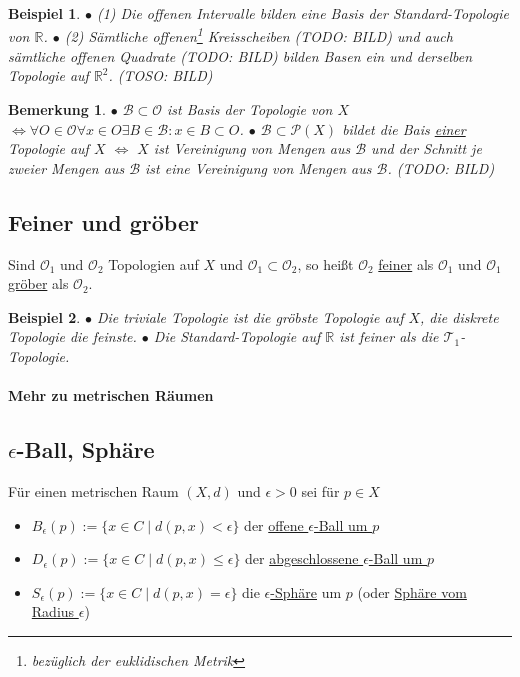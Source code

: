 \documentclass[a4paper,11pt,notitlepage]{report}
\newtheorem{definition}{Definition}[chapter]
\newtheorem{remark}{Bemerkung}[chapter]
\newtheorem{example}{Beispiel}[chapter]
\newcommand{\R}{{\ensuremath{\mathbb{R}}}}
\newcommand{\OO}{{\ensuremath{\mathcal{O}}}}
\newenvironment{Kasten}[1]
{
\hspace{0.05\linewidth}
\begin{center}
\begin{minipage}{0.9\linewidth}
\setlength{\fboxsep}{18pt}
\definecolor{shadecolor}{gray}{0.9}
\definecolor{framecolor}{gray}{0}
\def\FrameCommand{\fcolorbox{framecolor}{shadecolor}}
\MakeFramed {\FrameRestore}
\subsection{#1}
\begin{itshape}
}
{
\end{itshape}
\endMakeFramed
\end{minipage}
\end{center}
\vspace{1em}
}
\begin{document}
\begin{example}
	$\bullet$ (1) Die offenen Intervalle bilden eine Basis der Standard-Topologie von $\R$.
	\newline
	$\bullet$ (2) Sämtliche offenen\footnote{bezüglich der euklidischen Metrik} Kreisscheiben (TODO: BILD) und auch sämtliche offenen Quadrate (TODO: BILD) bilden Basen ein und derselben Topologie auf $\R^2$.
	\newline
	(TOSO: BILD)
\end{example}

\begin{remark}
	$\bullet$ $\mathcal{B} \subset \OO$ ist Basis der Topologie von $X$ $\Leftrightarrow \forall O \in \OO \forall x \in O \exists B \in \mathcal{B} \colon x \in B \subset O$.
	\newline
	$\bullet$ $\mathcal{B} \subset \mathcal{P}(X)$ bildet die Bais \underline{einer} Topologie auf $X$ $\Leftrightarrow$ $X$ ist Vereinigung von Mengen aus $\mathcal{B}$ und der Schnitt je zweier Mengen aus $\mathcal{B}$ ist eine Vereinigung von Mengen aus $\mathcal{B}$.
	\newline
	(TODO: BILD)
\end{remark}

\begin{Kasten}{Feiner und gröber}
	Sind $\OO_1$ und $\OO_2$ Topologien auf $X$ und $\OO_1 \subset \OO_2$, so heißt $\OO_2$ \underline{feiner} als $\OO_1$ und $\OO_1$ \underline{gröber} als $\OO_2$.
\end{Kasten}

\begin{example}
	$\bullet$ Die triviale Topologie ist die gröbste Topologie auf $X$, die diskrete Topologie die feinste.
	\newline
	$\bullet$ Die Standard-Topologie auf $\R$ ist feiner als die $\mathcal{T}_1$-Topologie.
\end{example}

\paragraph{Mehr zu metrischen Räumen}

\begin{Kasten}{$\epsilon$-Ball, Sphäre}
	Für einen metrischen Raum $(X,d)$ und $\epsilon > 0$ sei für $p \in X$
	\begin{itemize}
		\item $B_\epsilon(p):=\{x \in C \mid d(p,x) < \epsilon \}$ der \underline{offene $\epsilon$-Ball um $p$}
		\item $D_\epsilon(p):=\{x \in C \mid d(p,x) \leq \epsilon \}$ der \underline{abgeschlossene $\epsilon$-Ball um $p$}
		\item $S_\epsilon(p):=\{x \in C \mid d(p,x) = \epsilon \}$ die \underline{ $\epsilon$-Sphäre} um $p$ (oder \underline{Sphäre vom Radius $\epsilon$})
	\end{itemize}
\end{Kasten}
\end{document}
